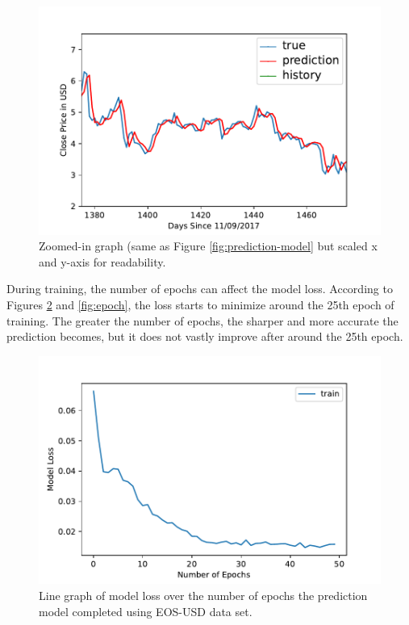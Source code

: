 \begin{figure}[htb]
\includegraphics[width=\columnwidth]{images/EOS-USD-prediction-model-zoomed.pdf}

\caption{Zoomed-in graph (same as Figure \ref{fig:prediction-model} but scaled x and y-axis for readability.}
\label{fig:zoomed}
\end{figure}

During training, the number of epochs can affect the model
loss. According to Figures \ref{fig:loss} and \ref{fig:epoch}, the
loss starts to minimize around the 25th epoch of training. The greater
the number of epochs, the sharper and more accurate the prediction
becomes, but it does not vastly improve after around the 25th epoch.

\begin{figure}[htb]
\includegraphics[width=\columnwidth]{images/EOS-USD-training-loss.pdf}

\caption{Line graph of model loss over the number of epochs the
  prediction model completed using EOS-USD data set.}

\label{fig:loss}
\end{figure}

